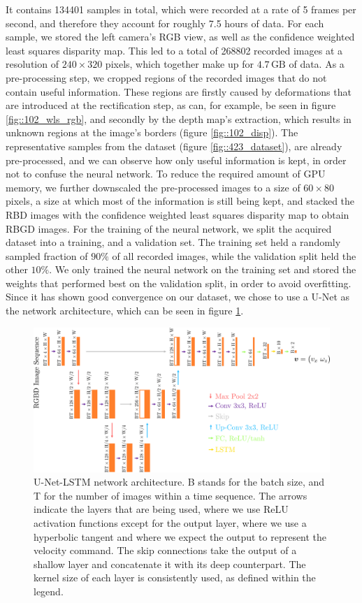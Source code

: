 It contains 134401 samples in total, which were recorded at a rate of 5 frames per second, and therefore they account for roughly 7.5 hours of data. For each sample, we stored the left camera's RGB view, as well as the confidence weighted least squares disparity map. This led to a total of 268802 recorded images at a resolution of $240\times320$ pixels, which together make up for $4.7\,\text{GB}$ of data. As a pre-processing step, we cropped regions of the recorded images that do not contain useful information. These regions are firstly caused by deformations that are introduced at the rectification step, as can, for example, be seen in figure \ref{fig::102_wls_rgb}, and secondly by the depth map's extraction, which results in unknown regions at the image's borders (figure \ref{fig::102_disp}). The representative samples from the dataset (figure \ref{fig::423_dataset}), are already pre-processed, and we can observe how only useful information is kept, in order not to confuse the neural network. To reduce the required amount of GPU memory, we further downscaled the pre-processed images to a size of $60\times80$ pixels, a size at which most of the information is still being kept, and stacked the RBD images with the confidence weighted least squares disparity map to obtain RBGD images. For the training of the neural network, we split the acquired dataset into a training, and a validation set. The training set held a randomly sampled fraction of $90\%$ of all recorded images, while the validation split held the other $10\%$. We only trained the neural network on the training set and stored the weights that performed best on the validation split, in order to avoid overfitting. Since it has shown good convergence on our dataset, we chose to use a U-Net \cite{ronneberger2015u} as the network architecture, which can be seen in figure \ref{fig::423_unet}.
\begin{figure}[h!]
	\centering
	\includegraphics[scale=.5]{chapters/11_autonomous_walking_experiments/img/unet.png}
	\caption{U-Net-LSTM network architecture. B stands for the batch size, and T for the number of images within a time sequence. The arrows indicate the layers that are being used, where we use ReLU activation functions except for the output layer, where we use a hyperbolic tangent and where we expect the output to represent the velocity command. The skip connections take the output of a shallow layer and concatenate it with its deep counterpart. The kernel size of each layer is consistently used, as defined within the legend.}
	\label{fig::423_unet}
\end{figure}
